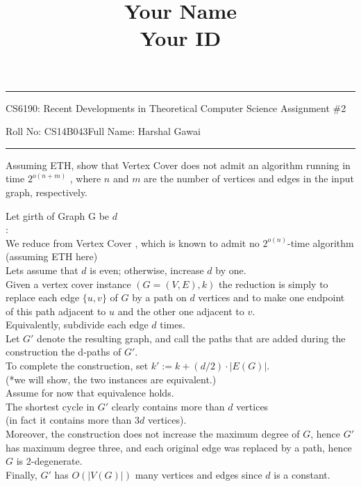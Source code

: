 \documentclass[11pt]{exam}
\title{Your Name\\ Your ID}
\author{}
\date{}
\begin{document}
\hrule
\vspace{3mm}
\noindent
{\sf CS6190: Recent Developments in Theoretical Computer Science  \hfill Assignment \#2}
\vspace{3mm}
\noindent


\noindent
{\sf Roll No: CS14B043\hfill Full Name: Harshal Gawai} 
\vspace{3mm}
\hrule
\begin{questions}
\question Assuming ETH, show that Vertex Cover does not admit an algorithm running in time $2^{o(n+m)}$ , where $n$ and $m$ are the number of vertices and edges in the input graph, respectively.
\begin{solution}
    Let girth of Graph G be $d$\\
    :\\
    We reduce from Vertex Cover , which is known to admit no $2^{o(n)}$-time algorithm (assuming ETH here)\\
    Lets assume that $d$ is even; otherwise, increase $d$ by one.\\
    Given a vertex cover instance $(G = (V, E), k)$ the reduction is simply to replace each edge $\{u,v\}$ of $G$ by a path on $d$ vertices and to make one endpoint of this path adjacent to $u$ and the other one adjacent to $v$. \\
    Equivalently, subdivide each edge $d$ times.\\
    Let $G'$ denote the resulting graph, and call the paths that are added during the construction the d-paths of $G'$.\\
    
    To complete the construction, set $k':= k + (d/2) \cdot |E(G)|$.\\
    (*we will show, the two instances are equivalent.)\\
    Assume for now that equivalence holds. \\
    The shortest cycle in $G'$ clearly contains more than $d$ vertices \\
    (in fact it contains more than $3d$ vertices).\\
    Moreover, the construction does not increase the maximum degree of $G$, hence $G'$ has maximum degree three, and each original edge was replaced by a path, hence $G$ is 2-degenerate.\\
    Finally, $G'$ has $O(|V(G)|)$ many vertices and edges since $d$ is a constant.\\
    

\end{solution}
\end{questions}
\end{document}
